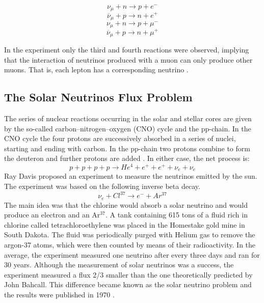%
\begin{equation}
	\nu_{\mu} + n \longrightarrow p + e^-
	\label{lss_primeira}
\end{equation}
\vspace{-0.85cm}
%
\begin{equation}
	\overline{\nu}_{\mu} + p \longrightarrow n + e^+
	\label{lss_segunda}
\end{equation}
%
\begin{equation}
	\nu_{\mu} + n \longrightarrow p + \mu^-
	\label{lss_terceira}
\end{equation}
\begin{equation}
	\overline{\nu}_{\mu} + p \longrightarrow n + \mu^+
	\label{lss_quarta}
\end{equation}


In the experiment only the third and fourth reactions were observed, implying that the interaction of neutrinos produced with a muon can only produce other muons. That is, each lepton has a corresponding neutrino \cite{two_neutrinos}.

\subsection{The Solar Neutrinos Flux Problem}
The series of nuclear reactions occurring in the solar and stellar cores are given by the so-called carbon–nitrogen–oxygen (CNO) cycle and the pp-chain. In the CNO cycle the four protons are successively absorbed in a series of nuclei, starting and ending with carbon. In the pp-chain two protons combine to form the deuteron and further protons are added \cite{the_story_of_the_neutrino}. In either case, the net process is:
%
\begin{equation}
	p+p+p+p \longrightarrow He^4 +e^+ + e^+ +\nu_e +\nu_e
	\label{solar_reaction}
\end{equation}
%
Ray Davis proposed an experiment to measure the neutrinos emitted by the sun. The experiment was based on the following inverse beta decay.
%
\begin{equation}
		\nu_e + Cl^{37} \longrightarrow e^- +Ar^{37}
		\label{solar_reaction}
\end{equation}
%
The main idea was that the chlorine would absorb a solar neutrino and would produce an electron and an Ar$^{37}$. A tank containing 615 tons of a fluid rich in chlorine called tetrachloroethylene was placed in the Homestake gold mine in South Dakota. The fluid was periodically purged with Helium gas to remove the argon-37 atoms, which were then counted by means of their radioactivity. In the average, the experiment measured one neutrino after every three days and ran for 30 years. Although the measurement of solar neutrinos was a success, the experiment measured a flux 2/3 smaller than the one theoretically predicted by John Bahcall. This difference became known as the solar neutrino problem and the results were published in 1970 \cite{the_story_of_the_neutrino}.

